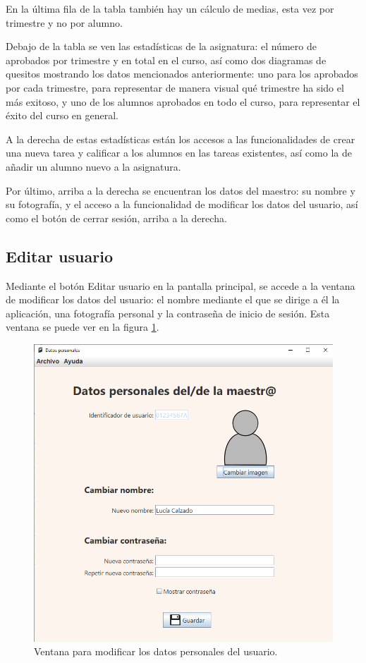 En la última fila de la tabla también hay un cálculo de medias, esta vez por trimestre y no por alumno.

Debajo de la tabla se ven las estadísticas de la asignatura: el número de aprobados por trimestre y en total en el curso, así como dos diagramas de quesitos mostrando los datos mencionados anteriormente: uno para los aprobados por cada trimestre, para representar de manera visual qué trimestre ha sido el más exitoso, y uno de los alumnos aprobados en todo el curso, para representar el éxito del curso en general.

A la derecha de estas estadísticas están los accesos a las funcionalidades de crear una nueva tarea y calificar a los alumnos en las tareas existentes, así como la de añadir un alumno nuevo a la asignatura.

Por último, arriba a la derecha se encuentran los datos del maestro: su nombre y su fotografía, y el acceso a la funcionalidad de modificar los datos del usuario, así como el botón de cerrar sesión, arriba a la derecha.


\subsection{Editar usuario}
Mediante el botón Editar usuario en la pantalla principal, se accede a la ventana de modificar los datos del usuario: el nombre mediante el que se dirige a él la aplicación, una fotografía personal y la contraseña de inicio de sesión. Esta ventana se puede ver en la figura \ref{Fig:datospersonales}.

\begin{figure}[h]
\centering\includegraphics[width=0.5\linewidth]{figs/datospersonales.png}
\caption{Ventana para modificar los datos personales del usuario.}
\label{Fig:datospersonales}
\end{figure}

